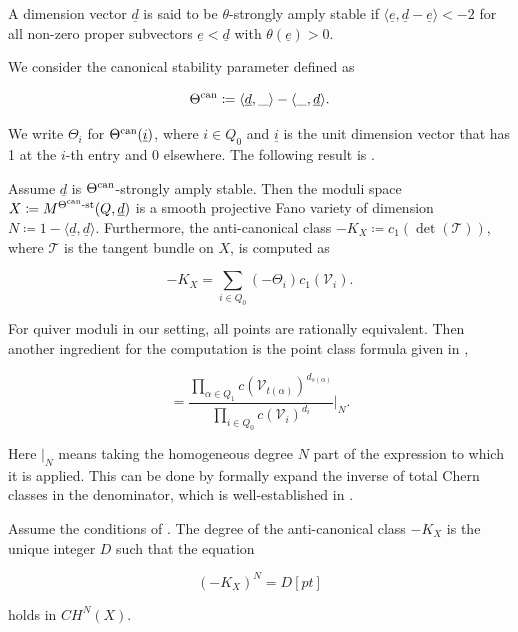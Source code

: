 \documentclass[11pt]{article}
\begin{document}
A dimension vector \(\underline{d}\) is said to be \(\theta\)-strongly amply stable if \(\langle \underline{e}, \underline{d} - \underline{e}\rangle < -2\) for all non-zero proper subvectors \(\underline{e} < \underline{d}\) with \(\theta(\underline{e}) > 0\). 

We consider the canonical stability parameter defined as 

\[
\Theta^{\text{can}}\coloneqq \langle \underline{d}, \_\rangle - \langle \_, \underline{d}\rangle.
\]

We write \(\Theta_i\) for \(\Theta^{\text{can}}(\underline{i})\), where \(i\in Q_0\) and \(\underline{i}\) is the unit dimension vector that has 1 at the \(i\)-th entry and 0 elsewhere. The following result is \cite[Theorem 4.3]{frRe2021fano}.

\begin{theorem}\label{Theorem:anti-can-class-formula}
    Assume \(\underline{d}\) is \(\Theta^{\text{can}}\)-strongly amply stable. Then the moduli space \(X\coloneqq M^{\Theta^{\text{can}}\text{-st}}(Q, \underline{d})\) is a smooth projective Fano variety of dimension \(N\coloneqq 1 - \langle \underline{d}, \underline{d}\rangle\). Furthermore, the anti-canonical class \(-K_X\coloneqq c_1(\det(\mathcal{T}))\), where \(\mathcal{T}\) is the tangent bundle on \(X\), is computed as 
    
    \begin{equation}
        -K_X = \sum_{i\in Q_0}(-\Theta_i) c_1(\mathcal{V}_i).
    \end{equation}
\end{theorem}

For quiver moduli in our setting, all points are rationally equivalent. Then another ingredient for the computation is the point class formula given in \cite[Theorem B]{belmans2024chow},

\begin{equation}
    [pt] = \frac{\prod_{\alpha\in Q_1}c(\mathcal{V}_{t(\alpha)})^{d_{s(\alpha)}}}{\prod_{i\in Q_0}c(\mathcal{V}_i)^{d_i}}\big|_N.\label{Equation:quiver-moduli-pt}
\end{equation}

Here \(|_N\) means taking the homogeneous degree \(N\) part of the expression to which it is applied. This can be done by formally expand the inverse of total Chern classes in the denominator, which is well-established in \cite[Section 3.2]{Fulton98}. 

\begin{definition}
    Assume the conditions of . The degree of the anti-canonical class \(-K_X\) is the unique integer \(D\) such that the equation

    \begin{equation}
        (-K_X)^N = D[pt]\label{Equation:Fano-deg-def}
    \end{equation}

    holds in \(CH^N(X)\). 
\end{definition}
\end{document}
